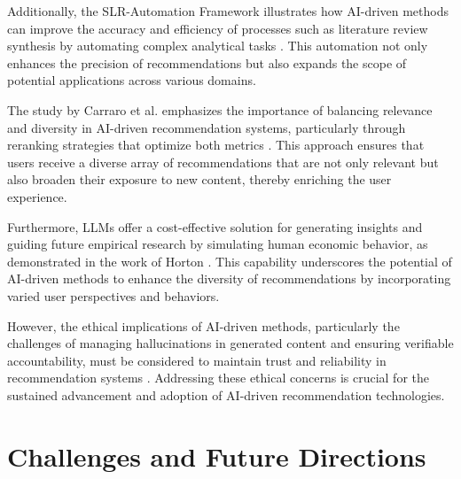 Additionally, the SLR-Automation Framework illustrates how AI-driven methods can improve the accuracy and efficiency of processes such as literature review synthesis by automating complex analytical tasks \cite{susnjak2024automatingresearchsynthesisdomainspecific}. This automation not only enhances the precision of recommendations but also expands the scope of potential applications across various domains.



The study by Carraro et al. emphasizes the importance of balancing relevance and diversity in AI-driven recommendation systems, particularly through reranking strategies that optimize both metrics \cite{carraro2024enhancingrecommendationdiversityreranking}. This approach ensures that users receive a diverse array of recommendations that are not only relevant but also broaden their exposure to new content, thereby enriching the user experience.



Furthermore, LLMs offer a cost-effective solution for generating insights and guiding future empirical research by simulating human economic behavior, as demonstrated in the work of Horton \cite{horton2023largelanguagemodelssimulated}. This capability underscores the potential of AI-driven methods to enhance the diversity of recommendations by incorporating varied user perspectives and behaviors.



However, the ethical implications of AI-driven methods, particularly the challenges of managing hallucinations in generated content and ensuring verifiable accountability, must be considered to maintain trust and reliability in recommendation systems \cite{jiao2024navigatingllmethicsadvancements}. Addressing these ethical concerns is crucial for the sustained advancement and adoption of AI-driven recommendation technologies.













\section{Challenges and Future Directions} \label{sec:Challenges and Future Directions}

